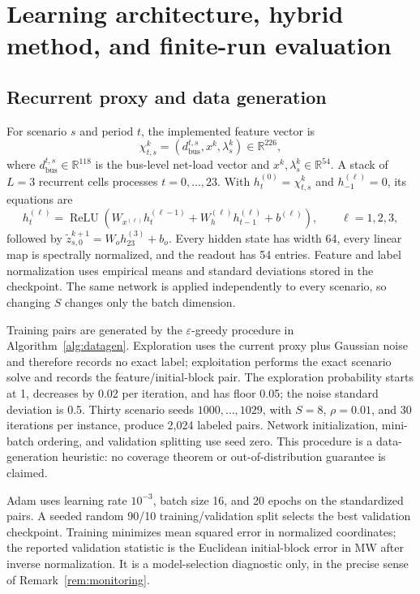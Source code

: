 \documentclass[preprint,12pt,3p]{elsarticle}
\theoremstyle{definition}
\begin{document}
\section{Learning architecture, hybrid method, and finite-run evaluation}
\subsection{Recurrent proxy and data generation}
For scenario $s$ and period $t$, the implemented feature vector is
\[
\chi_{t,s}^k=(d_{\mathrm{bus}}^{t,s},x^k,\lambda_s^k)\in\mathbb R^{226},
\]
where $d_{\mathrm{bus}}^{t,s}\in\mathbb R^{118}$ is the bus-level net-load vector and $x^k,\lambda_s^k\in\mathbb R^{54}$. A stack of $L=3$ recurrent cells processes $t=0,\ldots,23$. With $h_t^{(0)}=\chi_{t,s}^k$ and $h_{-1}^{(\ell)}=0$, its equations are
\begin{equation}
h_t^{(\ell)}=\operatorname{ReLU}\left(W_{x^{(\ell)}}h_t^{(\ell-1)}+W_h^{(\ell)}h_{t-1}^{(\ell)}+b^{(\ell)}\right),\qquad \ell=1,2,3,
\label{eq:rnn}
\end{equation}
followed by $\widetilde z_{s,0}^{k+1}=W_oh_{23}^{(3)}+b_o$. Every hidden state has width 64, every linear map is spectrally normalized, and the readout has 54 entries. Feature and label normalization uses empirical means and standard deviations stored in the checkpoint. The same network is applied independently to every scenario, so changing $S$ changes only the batch dimension.

Training pairs are generated by the $\varepsilon$-greedy procedure in Algorithm~\ref{alg:datagen}. Exploration uses the current proxy plus Gaussian noise and therefore records no exact label; exploitation performs the exact scenario solve and records the feature/initial-block pair. The exploration probability starts at 1, decreases by 0.02 per iteration, and has floor 0.05; the noise standard deviation is 0.5. Thirty scenario seeds $1000,\ldots,1029$, with $S=8$, $\rho=0.01$, and 30 iterations per instance, produce 2,024 labeled pairs. Network initialization, mini-batch ordering, and validation splitting use seed zero. This procedure is a data-generation heuristic: no coverage theorem or out-of-distribution guarantee is claimed.

Adam uses learning rate $10^{-3}$, batch size 16, and 20 epochs on the standardized pairs. A seeded random 90/10 training/validation split selects the best validation checkpoint. Training minimizes mean squared error in normalized coordinates; the reported validation statistic is the Euclidean initial-block error in MW after inverse normalization. It is a model-selection diagnostic only, in the precise sense of Remark~\ref{rem:monitoring}.
\end{document}
